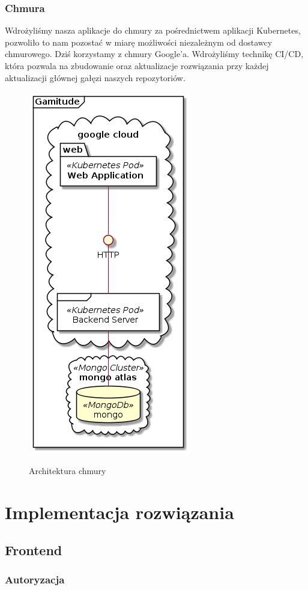 \documentclass[a4paper,11pt]{report}
\begin{document}
\subsection{Chmura}
Wdrożyliśmy nasza aplikacje do chmury za pośrednictwem aplikacji Kubernetes, pozwoliło to nam pozostać w miarę możliwości
niezależnym od dostawcy chmurowego. Dziś korzystamy z chmury Google'a.
Wdrożyliśmy technikę CI/CD, która pozwala na zbudowanie oraz aktualizacje rozwiązania przy każdej aktualizacji głównej gałęzi naszych repozytoriów.
\begin{figure}[h]
	\centering
	\includegraphics[scale=0.5]{gamitude_cloud_overview}\\
	\caption{Architektura chmury}
	\label{fig:db}
\end{figure}
\chapter {Implementacja rozwiązania}
\section{Frontend}
\subsection{Autoryzacja}
\end{document}
